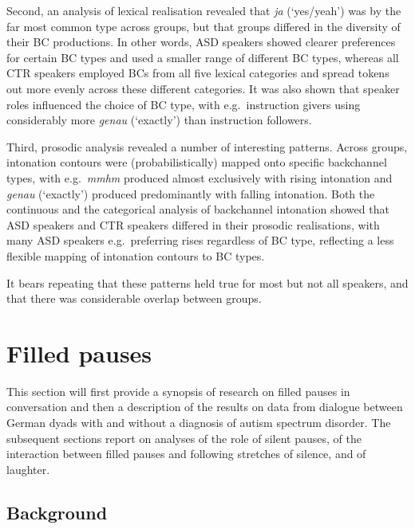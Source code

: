 Second, an analysis of lexical realisation revealed that \emph{ja} (`yes/yeah') was by the far most common type across groups, but that groups differed in the diversity of their BC productions. In other words, ASD speakers showed clearer preferences for certain BC types and used a smaller range of different BC types, whereas all CTR speakers employed BCs from all five lexical categories and spread tokens out more evenly across these different categories. It was also shown that speaker roles influenced the choice of BC type, with e.g.~instruction givers using considerably more \emph{genau} (`exactly') than instruction followers.

Third, prosodic analysis revealed a number of interesting patterns. Across groups, intonation contours were (probabilistically) mapped onto specific backchannel types, with e.g.~\emph{mmhm} produced almost exclusively with rising intonation and \emph{genau} (`exactly') produced predominantly with falling intonation. Both the continuous and the categorical analysis of backchannel intonation showed that ASD speakers and CTR speakers differed in their prosodic realisations, with many ASD speakers e.g.~preferring rises regardless of BC type, reflecting a less flexible mapping of intonation contours to BC types.

It bears repeating that these patterns held true for most but not all speakers, and that there was considerable overlap between groups.





\section{Filled pauses}\label{sec:BCFP_FP}

This section will first provide a synopsis of research on filled pauses in conversation and then a description of the results on data from dialogue between German dyads with and without a diagnosis of autism spectrum disorder. The subsequent sections report on analyses of the role of silent pauses, of the interaction between filled pauses and following stretches of silence, and of laughter.

\subsection{Background}\label{BCFP_FP_background}

